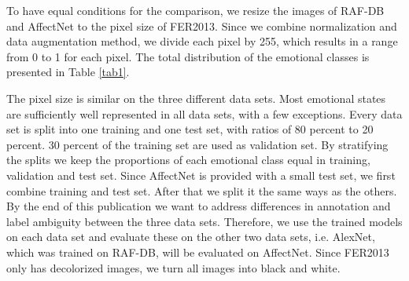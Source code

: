 \documentclass[a4paper, conference]{IEEEtran}
\begin{document}
To have equal conditions for the comparison, we resize the images of RAF-DB and AffectNet to the pixel size of FER2013. Since we combine normalization and data augmentation method, we divide each pixel by 255, which results in a range from 0 to 1 for each pixel. The total distribution of the emotional classes is presented in Table \ref{tab1}.

The pixel size is similar on the three different data sets. Most emotional states are sufficiently well represented in all data sets, with a few exceptions. Every data set is split into one training and one test set, with ratios of 80 percent to 20 percent. 30 percent of the training set are used as validation set. By stratifying the splits we keep the proportions of each emotional class equal in training, validation and test set. Since AffectNet is provided with a small test set, we first combine training and test set. After that we split it the same ways as the others.
By the end of this publication we want to address differences in annotation and label ambiguity between the three data sets. Therefore, we use the trained models on each data set and evaluate these on the other two data sets, i.e. AlexNet, which was trained on RAF-DB, will be evaluated on AffectNet. Since FER2013 only has decolorized images, we turn all images into black and white.
\end{document}
